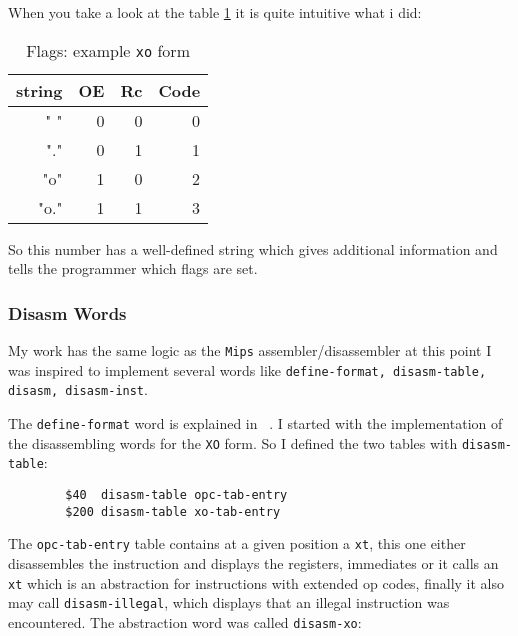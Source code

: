     When you take a look at the table \ref{xoflags} it is quite 
    intuitive what i did:

    \begin{table}
        \begin{center}
        \begin{tabular}{|r|rr|r|}
            \hline
            string & OE & Rc & Code\\
            \hline
            " " & 0 & 0 & 0 \\
            "." & 0 & 1 & 1 \\
            "o" & 1 & 0 & 2 \\
            "o." & 1 & 1 & 3 \\
            \hline
        \end{tabular}
        \end{center}
        \caption{\label{xoflags}Flags: example \texttt{xo} form}
    \end{table}

    So this number has a well-defined string which gives additional information
    and tells the programmer which flags are set.

    \subsubsection{Disasm Words}

    My work has the same logic as the \texttt{Mips} assembler/disassembler at
    this point I was inspired to implement several words like
    \texttt{define-format, disasm-table, disasm, disasm-inst}. 

    The \texttt{define-format} word is explained in ~\cite{gforthman}. I 
    started with the implementation of the disassembling words for the 
    \texttt{XO} form.  So I defined the two tables with \texttt{disasm-table}:

    \begin{verbatim}
        $40  disasm-table opc-tab-entry
        $200 disasm-table xo-tab-entry
    \end{verbatim}

    The \texttt{opc-tab-entry} table contains at a given position 
    a \texttt{xt}, this one either disassembles the instruction and displays
    the registers, immediates or it calls an \texttt{xt} which is an abstraction
    for instructions with extended op codes, finally it also may call
    \texttt{disasm-illegal}, which displays that an illegal instruction was
    encountered. The abstraction word was called \texttt{disasm-xo}:

